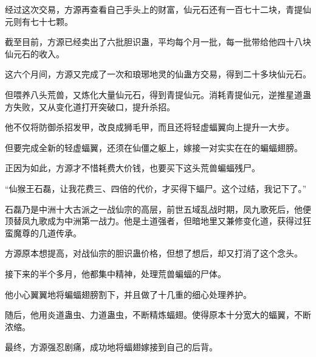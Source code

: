 \begin{this_body}
经过这次交易，方源再查看自己手头上的财富，仙元石还有一百七十二块，青提仙元则有七十七颗。

截至目前，方源已经卖出了六批胆识蛊，平均每个月一批，每一批带给他四十八块仙元石的收入。

这六个月间，方源又完成了一次和琅琊地灵的仙蛊方交易，得到二十多块仙元石。

但喂养八头荒兽，又炼化大量仙元石，得到青提仙元。消耗青提仙元，逆推星道蛊方失败，又从变化道打开突破口，提升杀招。

他不仅将防御杀招发甲，改良成狮毛甲，而且还将轻虚蝠翼向上提升一大步。

但要完成全新的轻虚蝠翼，还须在仙僵之躯上，嫁接一对实实在在的蝙蝠翅膀。

正因为如此，方源才不惜耗费大价钱，也要买下这头荒兽蝙蝠残尸。

“仙猴王石磊，让我花费三、四倍的代价，才买得下蝠尸。这个过结，我记下了。”

石磊乃是中洲十大古派之一战仙宗的高层，前世五域乱战时期，凤九歌死后，他便顶替凤九歌成为中洲第一战力。他是土道强者，但暗地里又兼修变化道，获得过狂蛮魔尊的几道传承。

方源原本想提高，对战仙宗的胆识蛊价格，但想了想后，却又打消了这个念头。

接下来的半个多月，他都集中精神，处理荒兽蝙蝠的尸体。

他小心翼翼地将蝙蝠翅膀割下，并且做了十几重的细心处理养护。

随后，他用炎道蛊虫、力道蛊虫，不断精炼蝠翅。使得原本十分宽大的蝠翼，不断浓缩。

最终，方源强忍剧痛，成功地将蝠翅嫁接到自己的后背。

\end{this_body}

